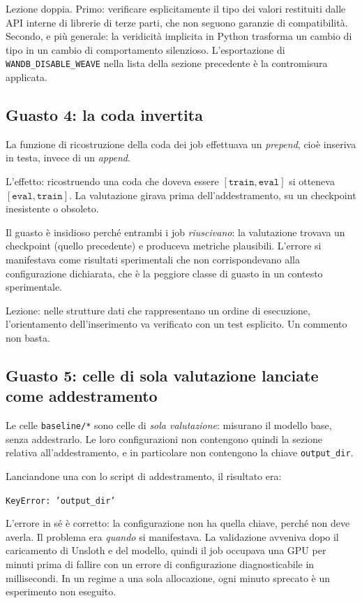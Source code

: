 Lezione doppia. Primo: verificare esplicitamente il tipo dei valori restituiti
dalle API interne di librerie di terze parti, che non seguono garanzie di
compatibilità. Secondo, e più generale: la veridicità implicita in Python
trasforma un cambio di tipo in un cambio di comportamento silenzioso.
L'esportazione di \texttt{WANDB\_DISABLE\_WEAVE} nella lista della sezione
precedente è la contromisura applicata.

\subsection{Guasto 4: la coda invertita}

La funzione di ricostruzione della coda dei job effettuava un \emph{prepend},
cioè inseriva in testa, invece di un \emph{append}.

L'effetto: ricostruendo una coda che doveva essere
$[\texttt{train}, \texttt{eval}]$ si otteneva $[\texttt{eval}, \texttt{train}]$.
La valutazione girava prima dell'addestramento, su un checkpoint inesistente o
obsoleto.

Il guasto è insidioso perché entrambi i job \emph{riuscivano}: la valutazione
trovava un checkpoint (quello precedente) e produceva metriche plausibili.
L'errore si manifestava come risultati sperimentali che non corrispondevano alla
configurazione dichiarata, che è la peggiore classe di guasto in un contesto
sperimentale.

Lezione: nelle strutture dati che rappresentano un ordine di esecuzione,
l'orientamento dell'inserimento va verificato con un test esplicito. Un
commento non basta.

\subsection{Guasto 5: celle di sola valutazione lanciate come addestramento}
\label{sec:bug-evalonly}

Le celle \texttt{baseline/*} sono celle di \emph{sola valutazione}: misurano il
modello base, senza addestrarlo. Le loro configurazioni non contengono quindi la
sezione relativa all'addestramento, e in particolare non contengono la chiave
\texttt{output\_dir}.

Lanciandone una con lo script di addestramento, il risultato era:
\begin{center}
\texttt{KeyError: 'output\_dir'}
\end{center}

L'errore in sé è corretto: la configurazione non ha quella chiave, perché non
deve averla. Il problema era \emph{quando} si manifestava. La validazione
avveniva dopo il caricamento di Unsloth e del modello, quindi il job occupava una
GPU per minuti prima di fallire con un errore di configurazione diagnosticabile
in millisecondi. In un regime a una sola allocazione, ogni minuto sprecato è un
esperimento non eseguito.

